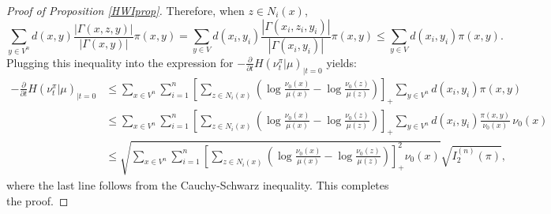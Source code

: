 \documentclass[11pt]{amsart}
\numberwithin{equation}{section}
\begin{document}
\begin{proof}[Proof of Proposition \ref{HWIprop}]
Therefore, when $z\in N_i(x)$,
$$\sum_{y \in V^n} d(x,y)\frac{|\Gamma(x,z,y)|}{|\Gamma(x,y)|} \pi(x,y)=\sum_{y \in V}  d(x_i,y_i)\frac{|\Gamma(x_i,z_i,y_i)|}{|\Gamma(x_i,y_i)|} \pi(x,y)\leq \sum_{y \in V}  d(x_i,y_i) \pi(x,y).$$
Plugging this inequality into the expression for  $-\frac{\partial}{\partial t}H(\nu_t^\pi|\mu)_{|t=0}$ yields:
\begin{align*}
-\frac{\partial}{\partial t}H(\nu_t^\pi|\mu)_{|t=0}
&\leq \sum_{x\in V^n} \sum_{i=1}^n \left[ \sum_{z\in N_i(x)} \left(\log  \frac{\nu_0(x)}{\mu(x)} - \log \frac{\nu_0(z)}{\mu(z)} \right) \right]_{+}
\sum_{y \in V^n} d(x_i,y_i)\pi(x,y)\\
&\leq \sum_{x\in V^n} \sum_{i=1}^n\left[ \sum_{z\in N_i(x)} \left( \log  \frac{\nu_0(x)}{\mu(x)} - \log \frac{\nu_0(z)}{\mu(z)} \right) \right]_{+}
\sum_{y \in V^n} d(x_i,y_i)\frac{\pi(x,y)}{\nu_0(x)}\,\nu_0(x)\\
&\leq \sqrt{\sum_{x\in V^n} \sum_{i=1}^n \left[\sum_{z\in N_i(x)} \left( \log  \frac{\nu_0(x)}{\mu(x)} - \log \frac{\nu_0(z)}{\mu(z)}  \right)\right]_{+}^2\nu_0(x)}\sqrt{I_2^{(n)}(\pi)},
\end{align*}
where the last line follows from the Cauchy-Schwarz inequality. This completes the proof.
\end{proof}
\end{document}

